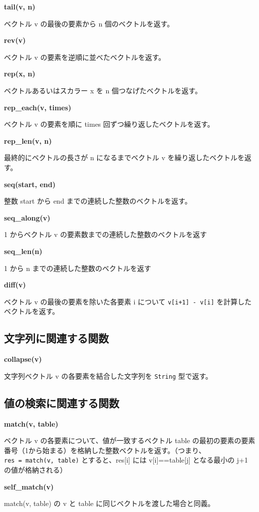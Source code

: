 \documentclass[]{book}
\begin{document}
\textbf{tail(v, n)}

ベクトル v の最後の要素から n 個のベクトルを返す。

\textbf{rev(v)}

ベクトル v の要素を逆順に並べたベクトルを返す。

\textbf{rep(x, n)}

ベクトルあるいはスカラー x を n 個つなげたベクトルを返す。

\textbf{rep\_each(v, times)}

ベクトル v の要素を順に times 回ずつ繰り返したベクトルを返す。

\textbf{rep\_len(v, n)}

最終的にベクトルの長さが n になるまでベクトル v を繰り返したベクトルを返す。

\textbf{seq(start, end)}

整数 start から end までの連続した整数のベクトルを返す。

\textbf{seq\_along(v)}

1 からベクトル v の要素数までの連続した整数のベクトルを返す

\textbf{seq\_len(n)}

1 から n までの連続した整数のベクトルを返す

\textbf{diff(v)}

ベクトル v の最後の要素を除いた各要素 i について \texttt{v{[}i+1{]}\ -\ v{[}i{]}} を計算したベクトルを返す。

\subsection{文字列に関連する関数}

\textbf{collapse(v)}

文字列ベクトル v の各要素を結合した文字列を \texttt{String} 型で返す。

\subsection{値の検索に関連する関数}

\textbf{match(v, table)}

ベクトル v の各要素について、値が一致するベクトル table の最初の要素の要素番号（1から始まる）を格納した整数ベクトルを返す。（つまり、\texttt{res\ =\ match(v,\ table)} とすると、res{[}i{]} には v{[}i{]}==table{[}j{]} となる最小の j+1 の値が格納される）

\textbf{self\_match(v)}

match(v, table) の v と table に同じベクトルを渡した場合と同義。
\end{document}
